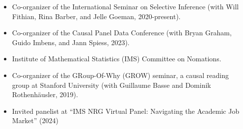 \documentclass{article}
\begin{document}
\begin{itemize}  
\item Co-organizer of the International Seminar on Selective Inference (with Will Fithian, Rina Barber, and Jelle Goeman, 2020-present).
\item Co-organizer of the Causal Panel Data Conference (with Bryan Graham, Guido Imbens, and Jann Spiess, 2023).
\item Institute of Mathematical Statistics (IMS) Committee on Nomations. 
\item Co-organizer of the GRoup-Of-Why (GROW) seminar, a causal reading group at Stanford University (with Guillaume Basse and Dominik Rothenhäusler, 2019).
\item Invited panelist at ``IMS NRG Virtual Panel: Navigating the Academic Job Market'' (2024)
\end{itemize}
\end{document}
